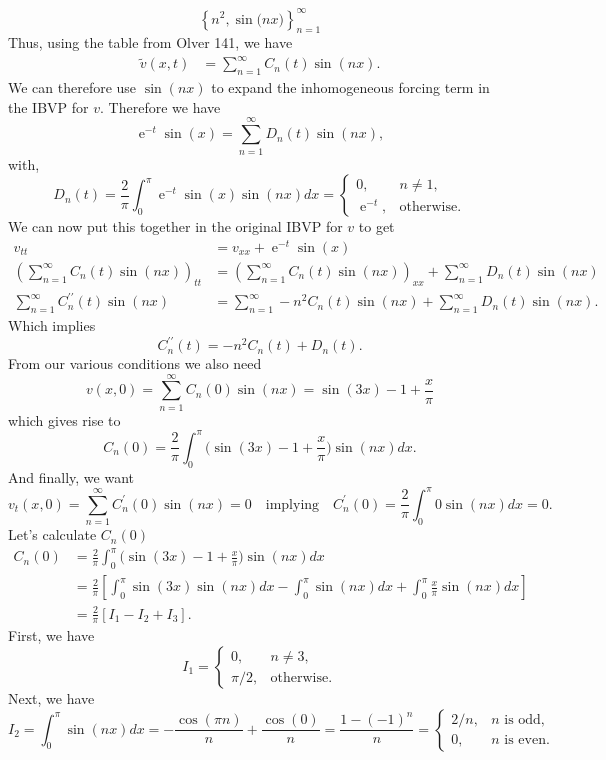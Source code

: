 \documentclass[10pt]{amsart}
\DeclareMathOperator{\E}{e}
\theoremstyle{nonumberplain}
\begin{document}
\begin{enumerate}[label={\bf {\arabic*}:}]
$$\left\{ n^2, \sin\big( n x \big) \right\}_{n=1}^\infty
$$
Thus, using the table from Olver 141, we have
\begin{align*}
\tilde v (x, t) &= \sum_{n=1}^\infty C_n(t) \sin(n x).
\end{align*}
We can therefore use $\sin(n x)$ to expand the inhomogeneous forcing term in the IBVP for $v$.
Therefore we have
$$
\E^{-t}\sin(x) = \sum_{n=1}^\infty D_n(t) \sin(n x),
$$
with,
$$
D_n(t) = \frac 2 \pi \int_0^\pi \E^{-t}\sin(x)\sin(nx)dx = \begin{cases} 0, &n \neq 1, \\ \E^{-t}, &\text{otherwise}.\end{cases}
$$
We can now put this together in the original IBVP for $v$ to get
\begin{align*}
v_{tt} &= v_{xx} + \E^{-t}\sin(x) \\
\left( \sum_{n=1}^\infty C_n(t) \sin(n x) \right)_{tt}
	&= \left( \sum_{n=1}^\infty C_n(t) \sin(n x) \right)_{xx}
	+ \sum_{n=1}^\infty D_n(t) \sin(n x) \\
\sum_{n=1}^\infty C_n^{\prime\prime}(t) \sin(n x)
	&= \sum_{n=1}^\infty -n^2 C_n(t) \sin(n x)
	+ \sum_{n=1}^\infty D_n(t) \sin(n x).
\end{align*}
Which implies
$$C_n^{\prime\prime}(t) = -n^2 C_n(t) + D_n(t).$$
From our various conditions we also need
$$
v (x, 0) = \sum_{n=1}^\infty C_n(0) \sin(n x) = \sin(3x) - 1 + \frac x \pi
$$
which gives rise to
$$
C_n(0) = \frac 2 \pi \int_0^\pi \Big( \sin(3x) - 1 + \frac x \pi \Big) \sin(nx) dx.
$$
And finally, we want
$$
v_t(x, 0) = \sum_{n=1}^\infty C_n^\prime(0) \sin(n x) = 0 \quad \text{implying} \quad C_n^\prime(0) = \frac 2 \pi \int_0^\pi 0 \sin(nx) dx = 0.
$$
Let's calculate $C_n(0)$
\begin{align*}
C_n(0) &= \frac 2 \pi \int_0^\pi \Big( \sin(3x) - 1 + \frac x \pi \Big) \sin(nx) dx \\
	&= \frac 2 \pi \left[ \int_0^\pi  \sin(3x) \sin(nx) dx - \int_0^\pi \sin(nx) dx + \int_0^\pi \frac x \pi \sin(nx) dx \right] \\
	&= \frac 2 \pi \left[ I_1 - I_2 + I_3 \right].
\end{align*}
First, we have
$$
I_1 = \begin{cases} 0, &n \neq 3, \\ \pi/2, &\text{otherwise}. \end{cases}
$$
Next, we have 
$$
I_2 = \int_0^\pi \sin(nx) dx = - \frac {\cos(\pi n)} n + \frac {\cos(0)} n = \frac {1 - (-1)^n} n = \begin{cases} 2/n, & n \text{ is odd,} \\ 0, & n \text{ is even}. \end{cases}
$$
\end{enumerate}
\end{document}
